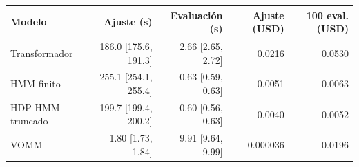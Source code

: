 \begin{tabular}{lrrrr}
\hline
Modelo & Ajuste (s) & Evaluación (s) & Ajuste (USD) & 100 eval. (USD) \\
\hline
Transformador & 186.0 [175.6, 191.3] & 2.66 [2.65, 2.72] & 0.0216 & 0.0530 \\
HMM finito & 255.1 [254.1, 255.4] & 0.63 [0.59, 0.63] & 0.0051 & 0.0063 \\
HDP-HMM truncado & 199.7 [199.4, 200.2] & 0.60 [0.56, 0.63] & 0.0040 & 0.0052 \\
VOMM & 1.80 [1.73, 1.84] & 9.91 [9.64, 9.99] & 0.000036 & 0.0196 \\
\hline
\end{tabular}

